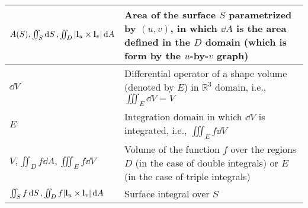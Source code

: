 \begin{xltabular}{\textwidth}{XX}
	\(A(S), \iint_S \dd{S}, \iint_D \abs{\mathbf{l}_u\times\mathbf{l}_v} \dd{A}\)                                                                                                                                                              & Area of the surface \(S\) parametrized by \((u,v)\), in which \(\dd{A}\) is the area defined in the \(D\) domain (which is form by the \(u\)-by-\(v\) graph)                                                                                                                                                                        \\ \hline
	\(\dd{V}\)                                                                                                                                                                                                                                 & Differential operator of a shape volume (denoted by \(E\)) in \(\mathbb{R}^3\) domain, i.e., \(\iiint_E \dd{V} = V\)                                                                                                                                                                                                                \\ \hline
	\(E\)                                                                                                                                                                                                                                      & Integration domain in which \(\dd{V}\) is integrated, i.e., \(\iiint_E f \dd{V}\) \cite{stewartCalculus2011}                                                                                                                                                                                                                        \\ \hline
	\(V, \iint_D f \dd{A}, \iiint_E f \dd{V}\)                                                                                                                                                                                                 & Volume of the function \(f\) over the regions \(D\) (in the case of double integrals) or \(E\) (in the case of triple integrals)                                                                                                                                                                                                    \\ \hline
	\(\iint_S f \dd{S}, \iint_D f \abs{\mathbf{l}_u\times\mathbf{l}_v} \dd{A}\)                                                                                                                                                                & Surface integral over \(S\)                                                                                                                                                                                                                                                                                                         \\ \hline

\end{xltabular}
